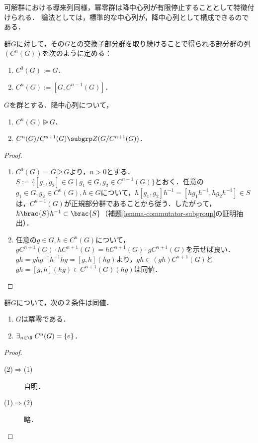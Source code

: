 \documentclass[uplatex,dvipdfmx]{jsreport}
\begin{document}
\begin{tcolorbox}[colframe=ForestGreen, colback=ForestGreen!10!white,breakable,colbacktitle=ForestGreen!40!white,coltitle=black,fonttitle=\bfseries\sffamily,
title=]
    可解群における導来列同様，冪零群は降中心列が有限停止することとして特徴付けられる．
    論法としては，標準的な中心列が，降中心列として構成できるのである．
\end{tcolorbox}

\begin{definition}
    群$G$に対して，その$G$との交換子部分群を取り続けることで得られる部分群の列$(C^n(G))$を次のように定める：
    \begin{enumerate}
        \item $C^0(G):=G$．
        \item $C^n(G):=[G,C^{n-1}(G)]$．
    \end{enumerate}
\end{definition}

\begin{lemma}
    $G$を群とする．降中心列について，
    \begin{enumerate}
        \item $C^n(G)\rsub G$．
        \item $C^n(G)/C^{n+1}(G)\subgrp Z(G/C^{n+1}(G))$．
    \end{enumerate}
\end{lemma}
\begin{proof}\mbox{}
    \begin{enumerate}
        \item $C^0(G)=G\rsub G$より，$n>0$とする．$S:=\{[g_1,g_2]\in G\mid g_1\in G,g_2\in C^{n-1}(G)\}$とおく．任意の$g_1\in G,g_2\in C^n(G),h\in G$について，$h[g_1,g_2]h^{-1}=[hg_1h^{-1},hg_2h^{-1}]\in S$は，$C^{n-1}(G)$が正規部分群であることから従う．したがって，$h\brac{S}h^{-1}\subset\brac{S}$（補題\ref{lemma-commutator-subgroup}の証明抽出）．
        \item 任意の$g\in G,h\in C^{n}(G)$について，$gC^{n+1}(G)\cdot hC^{n+1}(G)=hC^{n+1}(G)\cdot gC^{n+1}(G)$を示せば良い．$gh=ghg^{-1}h^{-1}hg=[g,h](hg)$より，$gh\in(gh)C^{n+1}(G)$と$gh=[g,h](hg)\in C^{n+1}(G)(hg)$は同値．
    \end{enumerate}
\end{proof}

\begin{proposition}[冪零群の特徴付け]
    群$G$について，次の２条件は同値．
    \begin{enumerate}
        \item $G$は冪零である．
        \item $\exists_{n\in\N}\;C^n(G)=\{e\}$．
    \end{enumerate}
\end{proposition}
\begin{proof}\mbox{}
    \begin{description}
        \item[(2)$\Rightarrow$(1)] 自明．
        \item[(1)$\Rightarrow$(2)] 略．
    \end{description}
\end{proof}
\end{document}
